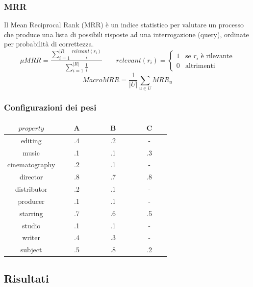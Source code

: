 \documentclass{beamer}
\begin{document}

\begin{frame}
	\frametitle{MRR}
	Il Mean Reciprocal Rank (MRR) è un indice statistico per valutare un processo che produce una lista di possibili risposte ad una interrogazione (query), ordinate per probabilità di correttezza.
		\begin{equation*}
			\mu MRR =\frac{\sum\limits_{i=1}^{|R|}{\frac{relevant(r_i)}{i}}}{\sum\limits_{i=1}^{|R|}{\frac{1}{i}}} \qquad relevant(r_i)=\begin{cases} 1 & \mbox{se }r_i\mbox{ è rilevante} \\ 0 & \mbox{altrimenti}
			\end{cases}
		\end{equation*}
		$$ MacroMRR =\frac{1}{|U|}\sum_{u\in U}{MRR_u} $$
\end{frame}


\begin{frame}
\frametitle{Configurazioni dei pesi}

\begin{center}
\begin{tabular}{c | ccc}
        \toprule
        $property$ & ~~~A~~~ & ~~~B~~~ & ~~~C~~~ \\
        \hline
        editing			& .4 & .2 & - \\
        music			& .1 & .1 & .3 \\
        cinematography 	& .2 & .1 & - \\
        director		& .8 & .7 & .8 \\
        distributor 	& .2 & .1 & - \\
        producer		& .1 & .1 & - \\
        starring		& .7 & .6 & .5 \\
        studio			& .1 & .1 & - \\
        writer			& .4 & .3 & - \\
        subject			& .5 & .8 & .2 \\
        \bottomrule
        \end{tabular}
\end{center}
\end{frame}

\subsection{Risultati}
\end{document}
